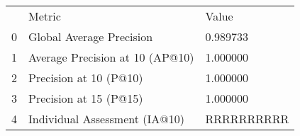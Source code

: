 \begin{tabular}{lll}
 & Metric & Value \\
0 & Global Average Precision & 0.989733 \\
1 & Average Precision at 10 (AP@10) & 1.000000 \\
2 & Precision at 10 (P@10) & 1.000000 \\
3 & Precision at 15 (P@15) & 1.000000 \\
4 & Individual Assessment (IA@10) & RRRRRRRRRR \\
\end{tabular}
